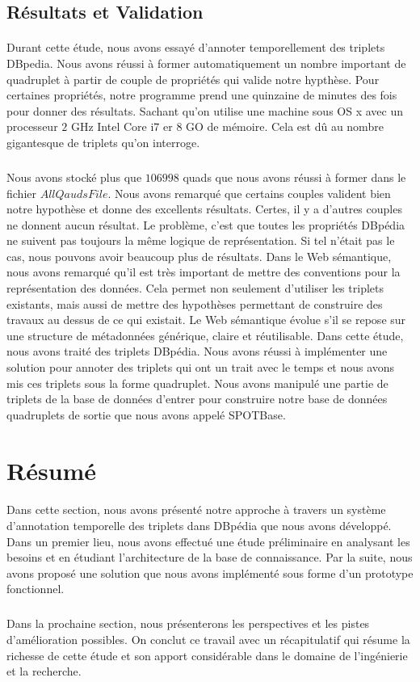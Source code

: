 \subsection{Résultats et Validation}
\paragraph{}
Durant cette étude, nous avons essayé d'annoter temporellement des triplets DBpedia. Nous avons réussi à former automatiquement un nombre important de quadruplet à partir de couple de propriétés qui valide notre hypthèse. Pour certaines propriétés, notre programme prend une quinzaine de minutes des fois pour donner des résultats. Sachant qu'on utilise une machine sous OS x avec un processeur $2$ GHz Intel Core i$7$ er $8$ GO de mémoire. Cela est dû au nombre gigantesque de triplets qu'on interroge.
\subparagraph{}
Nous avons stocké plus que $106998$ quads que nous avons réussi à former dans le fichier $AllQaudsFile$. Nous avons remarqué que certains couples valident bien notre hypothèse et donne des excellents résultats. Certes, il y a d'autres couples ne donnent aucun résultat. Le problème, c'est que toutes les propriétés DBpédia ne suivent pas toujours la même logique de représentation. Si tel n'était pas le cas, nous pouvons avoir beaucoup plus de résultats.
Dans le Web sémantique, nous avons remarqué qu'il est très important de mettre des conventions pour la représentation des données. Cela permet non seulement d'utiliser les triplets existants, mais aussi de mettre des hypothèses permettant de construire des travaux au dessus de ce qui existait. Le Web sémantique évolue s'il se repose sur une structure de métadonnées générique, claire et réutilisable. Dans cette étude, nous avons traité des triplets DBpédia. Nous avons réussi à implémenter une solution pour annoter des triplets qui ont un trait avec le temps et nous avons mis ces triplets sous la forme quadruplet. Nous avons manipulé une partie de triplets de la base de données d'entrer pour construire notre base de données quadruplets de sortie que nous avons appelé SPOTBase.
\section{Résumé}
\paragraph{}
Dans cette section, nous avons présenté notre approche à travers un système d'annotation temporelle des triplets dans DBpédia que nous avons développé. Dans un premier lieu, nous avons effectué une étude préliminaire en analysant les besoins et en étudiant l'architecture de la base de connaissance.
Par la suite, nous avons proposé une solution que nous avons implémenté sous forme d'un prototype fonctionnel.
\subparagraph{}
Dans la prochaine section, nous présenterons les perspectives et les pistes d'amélioration possibles. On conclut ce travail avec un récapitulatif qui résume la richesse de cette étude et son apport considérable dans le domaine de l'ingénierie et la recherche.  